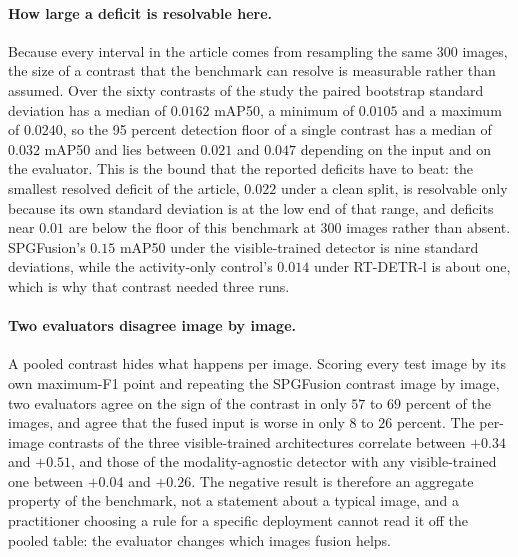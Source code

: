\documentclass[10pt,a4paper]{article}
\begin{document}
\begin{sloppypar}
\paragraph{How large a deficit is resolvable here.} Because every interval in the article
comes from resampling the same 300 images, the size of a contrast that the benchmark can
resolve is measurable rather than assumed. Over the sixty contrasts of the study the
paired bootstrap standard deviation has a median of $0.0162$ mAP50, a minimum of
$0.0105$ and a maximum of $0.0240$, so the 95 percent detection floor of a single
contrast has a median of $0.032$ mAP50 and lies between $0.021$ and $0.047$ depending
on the input and on the evaluator. This is the bound that the reported deficits have to
beat: the smallest resolved deficit of the article, $0.022$ under a clean split, is
resolvable only because its own standard deviation is at the low end of that range, and
deficits near $0.01$ are below the floor of this benchmark at 300 images rather than
absent. SPGFusion's $0.15$ mAP50 under the visible-trained detector is nine standard
deviations, while the activity-only control's $0.014$ under RT-DETR-l is about one,
which is why that contrast needed three runs.

\paragraph{Two evaluators disagree image by image.} A pooled contrast hides what
happens per image. Scoring every test image by its own maximum-F1 point and repeating
the SPGFusion contrast image by image, two evaluators agree on the sign of the contrast
in only $57$ to $69$ percent of the images, and agree that the fused input is worse in
only $8$ to $26$ percent. The per-image contrasts of the three visible-trained
architectures correlate between $+0.34$ and $+0.51$, and those of the modality-agnostic
detector with any visible-trained one between $+0.04$ and $+0.26$. The negative result
is therefore an aggregate property of the benchmark, not a statement about a typical
image, and a practitioner choosing a rule for a specific deployment cannot read it off
the pooled table: the evaluator changes which images fusion helps.


\end{sloppypar}
\end{document}
